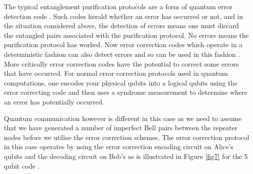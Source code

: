 \documentclass[twocolumn, aps, rmp, amsmath, amssymb, nofootinbib, superscriptaddress, longbibliography, floatfix, table-of-contents, eqsecnum]{revtex4-1}
\begin{document}
The typical entanglement purification protocols are a form of quantum error detection code \cite{WJM2015,devitt2013}. Such codes herald whether an error has occurred or not, and in the situation considered above, the detection of errors means one must discard the entangled pairs associated with the purification protocol. No errors means the purification protocol has worked. Now error correction codes which operate in a deterministic fashion can also detect errors and so can be used in this fashion \cite{jiang09,munro10}. More critically error correction codes have the potential to correct some errors that have occurred.  For normal error correction protocols used in quantum computations, one encodes your physical qubits into a logical qubits using the error correcting code and then uses a syndrome measurement to determine where an error has potentially occurred.

Quantum communication however is different in this case as we need to assume that we have generated a number of imperfect Bell pairs between the repeater nodes before we utilise the error correction schemes. The error correction protocol in this case operates by using the error correction encoding circuit on Alice's qubits and the decoding circuit on Bob's \cite{Aschauer2004} as is illustrated in Figure \ref{fig7} for the 5 qubit code \cite{Bennettr1996a,Knill97}.
\end{document}
